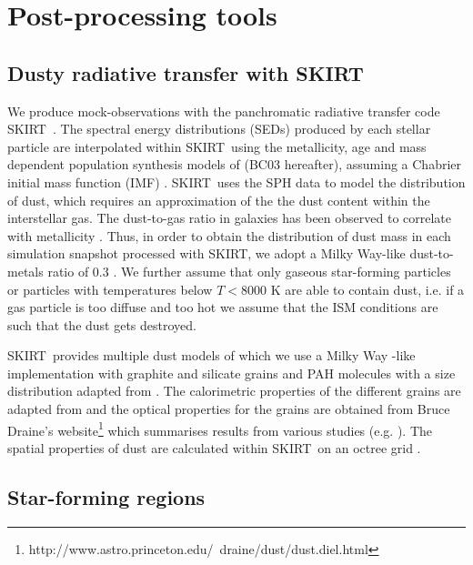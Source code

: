 \documentclass[a4paper,fleqn,usenatbib]{mnras}
\newcommand{\skirt}{\textsc{SKIRT}}
\begin{document}
\section{Post-processing tools}\label{section:post_processing}

\subsection{Dusty radiative transfer with \skirt}

We produce mock-observations with the panchromatic radiative transfer 
code \skirt\ \citep{2015A&C.....9...20C, 2014A&A...561A..77S}.
The spectral energy distributions (SEDs) produced by each stellar particle are
interpolated within \skirt\ using the metallicity,
age and mass dependent population synthesis models of \citet{2003MNRAS.344.1000B} (BC03 hereafter), assuming a Chabrier initial mass function (IMF)
\citep{2003PASP..115..763C}. \skirt\ uses the SPH data to model the distribution 
of dust, which requires an approximation of the the dust content within the interstellar gas. 
The dust-to-gas ratio in galaxies has been observed to  
correlate with metallicity \citep{1990A&A...236..237I}. Thus, 
in order to obtain the distribution of dust mass in each simulation snapshot processed with \skirt,
we adopt a Milky Way-like dust-to-metals ratio 
of $0.3$ \citet{1998ApJ...501..643D}.
We further assume that only  
gaseous star-forming particles or particles with temperatures below $T<8000$ K are able to 
contain dust, i.e. if a gas particle is too diffuse and too hot we assume that 
the ISM conditions are such that the dust gets destroyed. 

\skirt\ provides multiple
dust models of which we use a Milky Way -like 
implementation with graphite and silicate grains and PAH molecules with a size distribution
adapted from \citet{2004ApJS..152..211Z}. The calorimetric properties of the different grains are adapted from
\citet{2001ApJ...551..807D} and 
the optical properties for the grains are obtained from Bruce Draine's 
website\footnote{http://www.astro.princeton.edu/~draine/dust/dust.diel.html} which summarises results from
various studies (e.g.
\citealt{1984ApJ...285...89D, 1993ApJ...402..441L, 2001ApJ...554..778L}). The spatial
properties of dust are calculated within \skirt\ on an octree grid 
\citep{2013A&A...554A..10S}.

\subsection{Star-forming regions}
\end{document}
